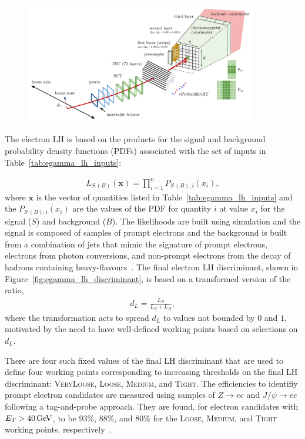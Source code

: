 \begin{figure}[!htb]
    \begin{center}
        \includegraphics[width=0.9\textwidth]{figures/chapter3/egamma/egamma_lh_input_desc}
        \caption{
        }
        \label{fig:egamma_lh_input_desc}
    \end{center}
\end{figure}

The electron LH is based on the products for the signal and background probability density
functions (PDFs) associated with the set of inputs in Table~\ref{tab:egamma_lh_inputs}:

\begin{align}
    L_{S\,(B)}(\mathbf{x}) = \prod\limits_{i=1}^n P_{S\,(B),i} (x_i),
    \label{eq:egamma_lh}
\end{align}
where $\mathbf{x}$ is the vector of quantities listed in Table~\ref{tab:egamma_lh_inputs} and
the $P_{S\,(B),i}(x_i)$ are the values of the PDF for quantity $i$ at value $x_i$ for the
signal ($S$) and background ($B$).
The likelihoods are built using simulation and the signal is composed of samples of prompt electrons
and the background is built from a combination of jets that mimic the signature of
prompt electrons, electrons from photon conversions, and non-prompt electrons from the decay
of hadrons containing heavy-flavours~\cite{Aad:2019tso}.
The final electron LH discriminant, shown in Figure~\ref{fig:egamma_lh_discriminant}, is based on a transformed version of the ratio,
\begin{align}
    d_L = \frac{L_S}{L_S + L_B},
    \label{eq:egamma_lh_disc}
\end{align}
where the transformation acts to spread $d_L$ to values not bounded by $0$ and $1$,
motivated by the need to have well-defined working points based on selections on $d_L$.

There are four such fixed values of the final LH discriminant that are used to define
four working points corresponding to increasing thresholds on the final LH discriminant:
\textsc{VeryLoose}, \textsc{Loose}, \textsc{Medium}, and \textsc{Tight}.
The efficiencies to identifiy prompt electron candidates are measured using samples of $Z\rightarrow ee$ and
$J/\psi \rightarrow ee$ following a tag-and-probe approach.
They are found, for electron candidates with $E_T > 40\,\text{Ge\kern -0.1em V}$,
to be 93\%, 88\%, and 80\% for the \textsc{Loose}, \textsc{Medium}, and \textsc{Tight} working points, respectively~\cite{Aad:2019tso}.

